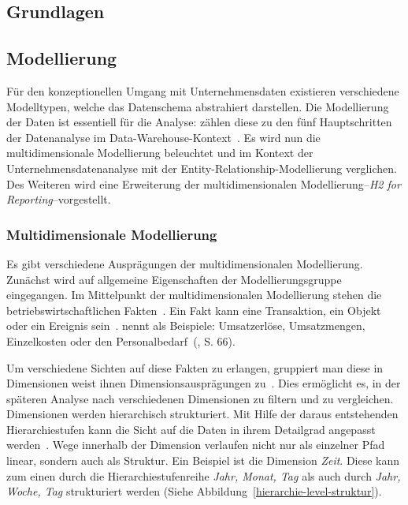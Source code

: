 \documentclass[
  language=german, %
  type=bachelor,%
  ngerman
]{isthesis}
\begin{document}
\begin{content}
  \chapter{Grundlagen}\label{ch:grundlagen}
  

  \section{Modellierung}

  Für den konzeptionellen Umgang mit Unternehmensdaten existieren verschiedene
  Modelltypen, welche das Datenschema abstrahiert darstellen.  Die Modellierung
  der Daten ist essentiell für die Analyse:
  \textsc{\citeauthor{phipps2002automating}} zählen diese zu den fünf
  Hauptschritten der Datenanalyse im Data-Warehouse-Kontext~\cite[][S.
  1]{phipps2002automating}. Es wird nun die multidimensionale Modellierung
  beleuchtet und im Kontext der Unternehmensdatenanalyse mit der
  Entity-Relationship-Modellierung verglichen. Des Weiteren wird eine
  Erweiterung der multidimensionalen Modellierung--\textit{H2 for
  Reporting}--vorgestellt.


  \subsection{Multidimensionale
  Modellierung}\label{subsec:multidimensionale-modellierung} 

  Es gibt verschiedene Ausprägungen der multidimensionalen Modellierung.
  Zunächst wird auf allgemeine Eigenschaften der Modellierungsgruppe
  eingegangen. Im Mittelpunkt der multidimensionalen Modellierung stehen die
  betriebswirtschaftlichen Fakten~\cite[][S.  2]{phipps2002automating}. Ein
  Fakt kann eine Transaktion, ein Objekt oder ein Ereignis sein~\cite[][S.
  42]{ballard1998data}. \textsc{\citeauthor{Kemper2010}} nennt als Beispiele:
  \glqq{}Umsatzerlöse, Umsatzmengen, Einzelkosten oder den
  Personalbedarf\grqq{}~(\citeyear{Kemper2010}, S. 66). 

  Um verschiedene Sichten auf diese Fakten zu erlangen, gruppiert man diese in
  Dimensionen \bzw{} weist ihnen Dimensionsausprägungen zu~\cite[][S.
  66]{Kemper2010}. Dies ermöglicht es, in der späteren Analyse nach
  verschiedenen Dimensionen zu filtern und zu vergleichen. Dimensionen werden
  hierarchisch strukturiert. Mit Hilfe der daraus entstehenden Hierarchiestufen
  kann die Sicht auf die Daten in ihrem Detailgrad angepasst werden~\cite[][S.
  66]{Kemper2010}. Wege innerhalb der Dimension verlaufen nicht nur als
  einzelner Pfad linear, sondern auch als Struktur. Ein Beispiel ist die
  Dimension \textit{Zeit}.  Diese kann zum einen durch die
  Hierarchiestufenreihe \textit{Jahr, Monat, Tag} als auch durch \textit{Jahr,
  Woche, Tag} strukturiert werden (Siehe
  Abbildung~\ref{hierarchie-level-struktur}).


\end{content}
\end{document}

